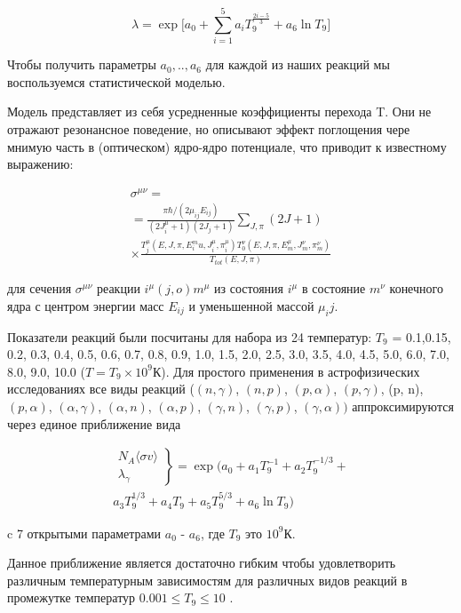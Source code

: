 \documentclass[14pt, a4paper]{article}
\numberwithin{figure}{section}
\numberwithin{equation}{section}
\begin{document}
$$\lambda = \exp \bigg[a_0 + \sum_{i=1}^{5}a_iT_9^{\frac{2i-5}{3}}+a_6 \ln T_9\bigg]$$

Чтобы получить параметры $a_0, .., a_6$ для каждой из наших реакций мы воспользуемся статистической моделью.

Модель представляет из себя усредненные коэффициенты перехода T. Они не отражают резонансное поведение, но описывают эффект поглощения чере мнимую часть в (оптическом) ядро-ядро потенциале, что приводит к известному выражению:


\begin{multline}
\sigma^{\mu\nu} = \\
= \frac{\pi\hbar/(2\mu_{ij}E_{ij})}{(2J_i^\mu+1)(2J_j+1)}\sum_{J,\pi}(2J + 1) \\
\times \frac{T_j^\mu(E,J,\pi,E_i^mu, J_i^\mu,\pi_i^\mu)T_0^\nu(E,J,\pi,E_m^\mu,J_m^\nu,\pi_m^\nu)}{T_{tot}(E,J,\pi)}
\end{multline}

для сечения $\sigma^{\mu\nu}$ реакции $i^\mu(j,o)m^\mu$ из состояния $i^\mu$ в состояние $m^\nu$ конечного ядра с центром энергии масс $E_{ij}$ и уменьшенной массой $\mu_ij$.

Показатели реакций были посчитаны для набора из 24 температур: $T_9$ = 0.1,0.15, 0.2, 0.3, 0.4, 0.5, 0.6, 0.7, 0.8, 0.9, 1.0, 1.5, 2.0, 2.5, 3.0, 3.5, 4.0, 4.5, 5.0, 6.0, 7.0, 8.0, 9.0, 10.0 ($T = T_9 \times 10^{9}\text{К}$). Для простого применения в астрофизических исследованиях все виды реакций ($(n,\gamma)$, $(n,p)$, $(p,\alpha)$, $(p, \gamma)$, (p, n), $(p, \alpha)$, $(\alpha, \gamma)$, $(\alpha, n)$, $(\alpha, p)$, $(\gamma, n)$, $(\gamma, p)$, $(\gamma, \alpha))$ аппроксимируются через единое приближение вида

\begin{equation}
\label{eq:system}
\begin{split}
\left.
	\begin{array}{ccc}
		N_{A}\langle \sigma v \rangle \\
		\lambda_\gamma
	\end{array}
\right\}
 = \exp (a_0 + a_1 T_9^{-1} + a_2 T_9^{-1/3} + \\
a_3 T_9^{1/3} + a_4 T_9 + a_5 T_9^{5/3} + a_6 \ln T_9)
\end{split}
\end{equation}

c 7 открытыми параметрами $a_0$ - $a_6$, где $T_9$ это $10^9$К.

Данное приближение является достаточно гибким чтобы удовлетворить различным температурным зависимостям для различных видов реакций в промежутке температур $0.001 \le T_9 \le 10$ \cite{rates}.
\end{document}

